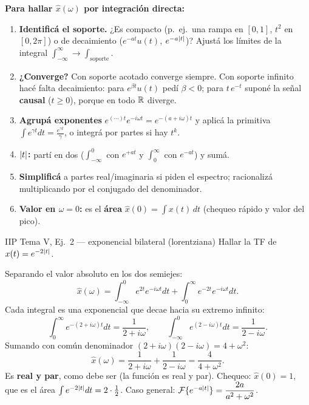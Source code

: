 \begin{receta}
\textbf{Para hallar $\hat x(\omega)$ por integración directa:}
\begin{enumerate}
\item \textbf{Identificá el soporte.} ¿Es compacto (p.\ ej.\ una rampa en $[0,1]$, $t^2$ en $[0,2\pi]$) o de decaimiento ($e^{-at}u(t)$, $e^{-a\left\lvert t \right\rvert}$)? Ajustá los límites de la integral $\int_{-\infty}^\infty\!\to\int_{\text{soporte}}$.
\item \textbf{¿Converge?} Con soporte acotado converge siempre. Con soporte infinito hacé falta decaimiento: para $e^{\beta t}u(t)$ pedí $\beta<0$; para $t\,e^{-t}$ suponé la señal \textbf{causal} ($t\ge0$), porque en todo $\mathbb{R}$ diverge.
\item \textbf{Agrupá exponentes} $e^{(\cdots)t}e^{-i\omega t}=e^{-(a+i\omega)t}$ y aplicá la primitiva $\int e^{\gamma t}dt=\tfrac{e^{\gamma t}}{\gamma}$, o integrá por partes si hay $t^k$.
\item \textbf{$\left\lvert t \right\rvert$:} partí en dos ($\int_{-\infty}^0$ con $e^{+at}$ y $\int_0^\infty$ con $e^{-at}$) y sumá.
\item \textbf{Simplificá} a partes real/imaginaria si piden el espectro; racionalizá multiplicando por el conjugado del denominador.
\item \textbf{Valor en $\omega=0$:} es el \textbf{área} $\hat x(0)=\int x(t)\,dt$ (chequeo rápido y valor del pico).
\end{enumerate}
\end{receta}

\begin{ejemplo}{IIP Tema V, Ej.\ 2 — exponencial bilateral (lorentziana)}
Hallar la TF de $x(t)=e^{-2\left\lvert t \right\rvert}$.

\medskip
Separando el valor absoluto en los dos semiejes:
\[
\hat x(\omega)=\int_{-\infty}^{0}e^{2t}e^{-i\omega t}dt+\int_{0}^{\infty}e^{-2t}e^{-i\omega t}dt.
\]
Cada integral es una exponencial que decae hacia su extremo infinito:
\[
\int_{0}^{\infty}e^{-(2+i\omega)t}dt=\frac{1}{2+i\omega},\qquad
\int_{-\infty}^{0}e^{(2-i\omega)t}dt=\frac{1}{2-i\omega}.
\]
Sumando con común denominador $(2+i\omega)(2-i\omega)=4+\omega^2$:
\[
\boxed{\;\hat x(\omega)=\frac{1}{2+i\omega}+\frac{1}{2-i\omega}=\frac{4}{4+\omega^2}.\;}
\]
Es \textbf{real y par}, como debe ser (la función es real y par). Chequeo: $\hat x(0)=1$, que es el área $\int e^{-2\left\lvert t \right\rvert}dt=2\cdot\tfrac12$. Caso general: $\mathcal F\{e^{-a\left\lvert t \right\rvert}\}=\dfrac{2a}{a^2+\omega^2}$.
\end{ejemplo}

